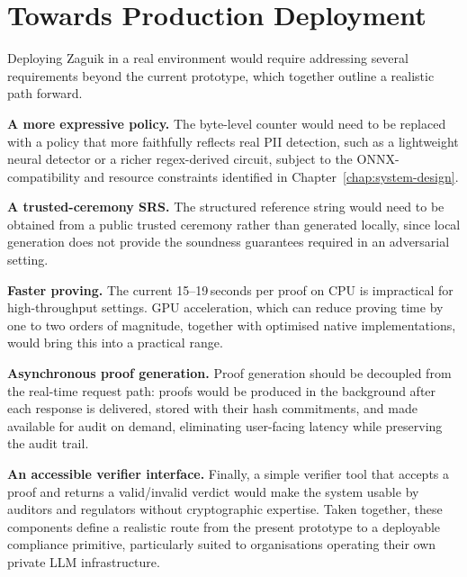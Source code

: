 \section{Towards Production Deployment}
\label{sec:disc-production}

Deploying Zaguik in a real environment would require addressing several requirements beyond the current prototype, which together outline a realistic path forward.

\medskip

\textbf{A more expressive policy.} The byte-level counter would need to be replaced with a policy that more faithfully reflects real PII detection, such as a lightweight neural detector or a richer regex-derived circuit, subject to the ONNX-compatibility and resource constraints identified in Chapter~\ref{chap:system-design}.

\medskip

\textbf{A trusted-ceremony SRS.} The structured reference string would need to be obtained from a public trusted ceremony rather than generated locally, since local generation does not provide the soundness guarantees required in an adversarial setting.

\medskip

\textbf{Faster proving.} The current 15--19\,seconds per proof on CPU is impractical for high-throughput settings. GPU acceleration, which can reduce proving time by one to two orders of magnitude, together with optimised native implementations, would bring this into a practical range.

\medskip

\textbf{Asynchronous proof generation.} Proof generation should be decoupled from the real-time request path: proofs would be produced in the background after each response is delivered, stored with their hash commitments, and made available for audit on demand, eliminating user-facing latency while preserving the audit trail.

\medskip

\textbf{An accessible verifier interface.} Finally, a simple verifier tool that accepts a proof and returns a valid/invalid verdict would make the system usable by auditors and regulators without cryptographic expertise. Taken together, these components define a realistic route from the present prototype to a deployable compliance primitive, particularly suited to organisations operating their own private LLM infrastructure.
